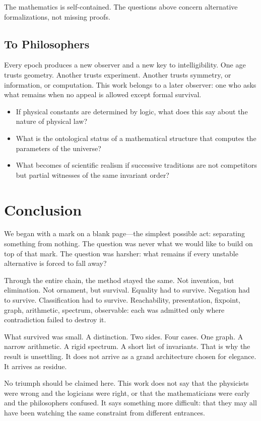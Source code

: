 \documentclass[11pt,a4paper]{book}
\begin{document}
The mathematics is self-contained.  The questions above concern alternative
formalizations, not missing proofs.

\section{To Philosophers}

Every epoch produces a new observer and a new key to intelligibility.
One age trusts geometry. Another trusts experiment. Another trusts
symmetry, or information, or computation. This work belongs to a later
observer: one who asks what remains when no appeal is allowed except
formal survival.

\begin{itemize}
\item If physical constants are determined by logic, what does this say
  about the nature of physical law?
\item What is the ontological status of a mathematical structure that
  computes the parameters of the universe?
\item What becomes of scientific realism if successive traditions are
  not competitors but partial witnesses of the same invariant order?
\end{itemize}

\chapter{Conclusion}

We began with a mark on a blank page---the simplest possible act:
separating something from nothing. The question was never what we
would like to build on top of that mark. The question was harsher:
what remains if every unstable alternative is forced to fall away?

Through the entire chain, the method stayed the same. Not invention,
but elimination. Not ornament, but survival. Equality had to survive.
Negation had to survive. Classification had to survive. Reachability,
presentation, fixpoint, graph, arithmetic, spectrum, observable: each
was admitted only where contradiction failed to destroy it.

What survived was small. A distinction. Two sides. Four cases. One
graph. A narrow arithmetic. A rigid spectrum. A short list of
invariants. That is why the result is unsettling. It does not arrive
as a grand architecture chosen for elegance. It arrives as residue.

No triumph should be claimed here. This work does not say that the
physicists were wrong and the logicians were right, or that the
mathematicians were early and the philosophers confused. It says
something more difficult: that they may all have been watching the same
constraint from different entrances.
\end{document}

